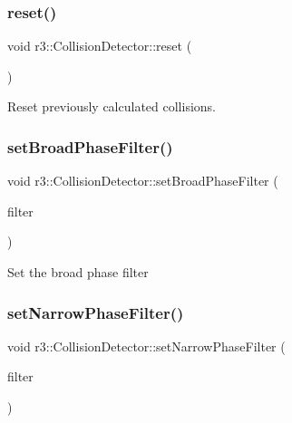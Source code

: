\subsubsection{\texorpdfstring{reset()}{reset()}}
{\footnotesize\ttfamily void r3\+::\+Collision\+Detector\+::reset (\begin{DoxyParamCaption}{ }\end{DoxyParamCaption})}

Reset previously calculated collisions. \mbox{\label{classr3_1_1_collision_detector_a2184ca2db73a6446cf028e3b742c7cc4}} 
\subsubsection{\texorpdfstring{set\+Broad\+Phase\+Filter()}{setBroadPhaseFilter()}}
{\footnotesize\ttfamily void r3\+::\+Collision\+Detector\+::set\+Broad\+Phase\+Filter (\begin{DoxyParamCaption}\item[{\mbox{\hyperlink{classr3_1_1_collision_detector_aa8ed51d53c6f6ce545c93ad0e356d6de}{Broad\+Phase\+Filter\+\_\+\+Ptr}}}]{filter }\end{DoxyParamCaption})}

Set the broad phase filter \mbox{\label{classr3_1_1_collision_detector_a98f6ab749622d7fcffbdc0dcf59cfa75}} 
\subsubsection{\texorpdfstring{set\+Narrow\+Phase\+Filter()}{setNarrowPhaseFilter()}}
{\footnotesize\ttfamily void r3\+::\+Collision\+Detector\+::set\+Narrow\+Phase\+Filter (\begin{DoxyParamCaption}\item[{\mbox{\hyperlink{classr3_1_1_collision_detector_a094cc287cba14d5a063cfca41e667008}{Narrow\+Phase\+Filter\+\_\+\+Ptr}}}]{filter }\end{DoxyParamCaption})}

